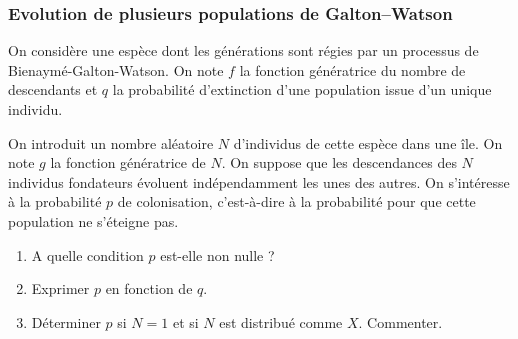 \subsubsection{Evolution de plusieurs populations de Galton–Watson}

On considère une espèce dont les générations sont régies par un processus de Bienaymé-Galton-Watson. On note $f$ la fonction génératrice du nombre de descendants et $q$ la probabilité d'extinction d'une population issue d'un unique individu.

On introduit un nombre aléatoire $N$ d'individus de cette espèce dans une île. On note $g$ la fonction génératrice de $N$. On suppose que les descendances des $N$ individus fondateurs évoluent indépendamment les unes des autres. On s'intéresse à la probabilité $p$ de colonisation, c'est-à-dire à la probabilité pour que cette population ne s'éteigne pas.
\begin{enumerate}
  \item A quelle condition $p$ est-elle non nulle ?
  \item Exprimer $p$ en fonction de $q$. 
  \item Déterminer $p$ si $N = 1$ et si $N$ est distribué comme $X$. Commenter.
\end{enumerate}

